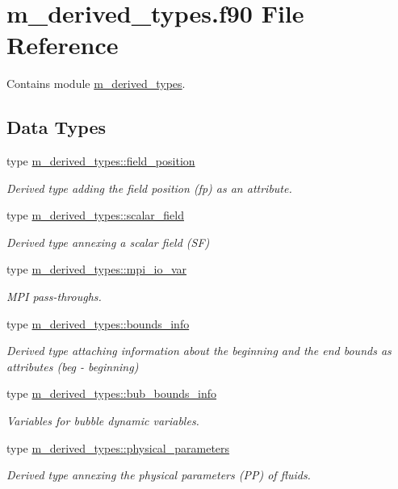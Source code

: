 \hypertarget{m__derived__types_8f90}{}\section{m\+\_\+derived\+\_\+types.\+f90 File Reference}
\label{m__derived__types_8f90}


Contains module \hyperlink{namespacem__derived__types}{m\+\_\+derived\+\_\+types}.  


\subsection*{Data Types}
\begin{DoxyCompactItemize}
\item 
type \hyperlink{structm__derived__types_1_1field__position}{m\+\_\+derived\+\_\+types\+::field\+\_\+position}
\begin{DoxyCompactList}\small\item\em Derived type adding the field position (fp) as an attribute. \end{DoxyCompactList}\item 
type \hyperlink{structm__derived__types_1_1scalar__field}{m\+\_\+derived\+\_\+types\+::scalar\+\_\+field}
\begin{DoxyCompactList}\small\item\em Derived type annexing a scalar field (SF) \end{DoxyCompactList}\item 
type \hyperlink{structm__derived__types_1_1mpi__io__var}{m\+\_\+derived\+\_\+types\+::mpi\+\_\+io\+\_\+var}
\begin{DoxyCompactList}\small\item\em M\+PI pass-\/throughs. \end{DoxyCompactList}\item 
type \hyperlink{structm__derived__types_1_1bounds__info}{m\+\_\+derived\+\_\+types\+::bounds\+\_\+info}
\begin{DoxyCompactList}\small\item\em Derived type attaching information about the beginning and the end bounds as attributes (beg -\/ beginning) \end{DoxyCompactList}\item 
type \hyperlink{structm__derived__types_1_1bub__bounds__info}{m\+\_\+derived\+\_\+types\+::bub\+\_\+bounds\+\_\+info}
\begin{DoxyCompactList}\small\item\em Variables for bubble dynamic variables. \end{DoxyCompactList}\item 
type \hyperlink{structm__derived__types_1_1physical__parameters}{m\+\_\+derived\+\_\+types\+::physical\+\_\+parameters}
\begin{DoxyCompactList}\small\item\em Derived type annexing the physical parameters (PP) of fluids. \end{DoxyCompactList}\end{DoxyCompactItemize}
